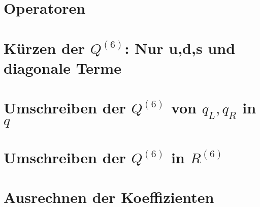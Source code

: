 \documentclass[a4,11pt]{article}
\begin{document}
\section{Operatoren}

\section{Kürzen der $Q^{(6)}$: Nur u,d,s und diagonale Terme}

\section{Umschreiben der $Q^{(6)}$ von $q_L,q_R$ in $q$}

\section{Umschreiben der $Q^{(6)}$ in $R^{(6)}$}

\section{Ausrechnen der Koeffizienten}

\end{document}
